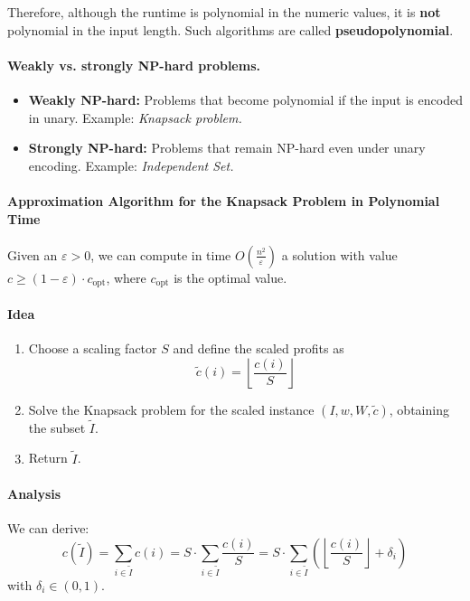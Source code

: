 \documentclass{article}
\begin{document}
Therefore, although the runtime is polynomial in the numeric values, it is \textbf{not} polynomial in the input length.  
Such algorithms are called \textbf{pseudopolynomial}.

\paragraph{Weakly vs. strongly NP-hard problems.}
\begin{itemize}
    \item \textbf{Weakly NP-hard:} Problems that become polynomial if the input is encoded in unary.  
    Example: \emph{Knapsack problem.}
    \item \textbf{Strongly NP-hard:} Problems that remain NP-hard even under unary encoding.  
    Example: \emph{Independent Set.}
\end{itemize}

\paragraph{Approximation Algorithm for the Knapsack Problem in Polynomial Time}

Given an $\varepsilon > 0$, we can compute in time $O\left(\frac{n^2}{\varepsilon}\right)$ a solution 
with value $c \ge (1 - \varepsilon) \cdot c_{\text{opt}}$, 
where $c_{\text{opt}}$ is the optimal value.

\paragraph{Idea}
\begin{enumerate}
    \item Choose a scaling factor $S$ and define the scaled profits as 
    \[
    \tilde{c}(i) = \left\lfloor \frac{c(i)}{S} \right\rfloor
    \]
    \item Solve the Knapsack problem for the scaled instance 
    $(I, w, W, \tilde{c})$, obtaining the subset $\tilde{I}$.
    \item Return $\tilde{I}$.
\end{enumerate}

\paragraph{Analysis}
We can derive:
\[
c(\tilde{I}) = \sum_{i \in \tilde{I}} c(i) 
= S \cdot \sum_{i \in \tilde{I}} \frac{c(i)}{S}
= S \cdot \sum_{i \in \tilde{I}} 
\left( \left\lfloor \frac{c(i)}{S} \right\rfloor + \delta_i \right)
\]
with $\delta_i \in (0,1)$.
\end{document}
